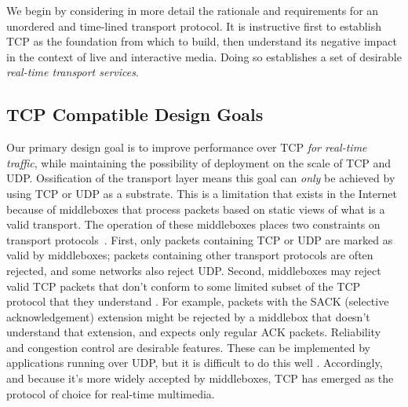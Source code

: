 
We begin by considering in more detail the rationale and requirements for an
unordered and time-lined transport protocol. It is instructive first to
establish TCP as the foundation from which to build, then understand its
negative impact in the context of live and interactive media. Doing so
establishes a set of desirable {\em real-time transport services}.

%

\subsection{TCP Compatible Design Goals}
\label{sec:background-tcp}

Our primary design goal is to improve performance over TCP \emph{for real-time
traffic}, while maintaining the possibility of deployment on the scale of TCP and
UDP. Ossification of the transport layer means this goal can \emph{only} be achieved by
using TCP or UDP as a substrate. This is a limitation that exists in the
Internet because of middleboxes that process packets based on static views of
what is a valid transport. The operation of these middleboxes places two constraints on transport
protocols~\cite{mcquistin:2015:reinterpreting}. First, only packets containing
TCP or UDP are marked as valid by middleboxes; packets containing other transport protocols
are often rejected, and some networks also reject UDP. 
Second, middleboxes may reject valid TCP packets that don't
conform to some limited subset of the TCP protocol that they understand
\cite{honda:2011:extend-tcp}. For example, packets with the
SACK (selective acknowledgement) extension might be rejected by a
middlebox that doesn't understand that extension, and expects only regular
ACK packets.
Reliability and congestion control are desirable features.
These can be implemented by applications running over UDP,
but it is difficult to do this well \cite{RFC5405}. Accordingly,
and because it's more widely accepted by middleboxes, TCP has emerged as
the protocol of choice for real-time multimedia.

